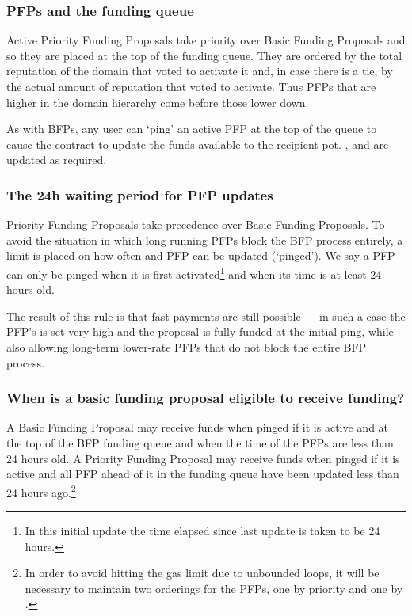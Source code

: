 \subsubsection{PFPs and the funding queue}

Active Priority Funding Proposals take priority over Basic Funding Proposals and so they are placed at the top of the funding queue. They are ordered by the total reputation of the domain that voted to activate it and, in case there is a tie, by the actual amount of reputation that voted to activate. Thus PFPs that are higher in the domain hierarchy come before those lower down.

As with BFPs, any user can `ping' an active PFP at the top of the queue to cause the contract to update the funds available to the recipient pot. ,  and  are updated as required.

\subsubsection{The 24h waiting period for PFP updates}
Priority Funding Proposals take precedence over Basic Funding Proposals. To avoid the situation in which long running PFPs block the BFP process entirely, a limit is placed on how often and PFP can be updated (`pinged'). We say a PFP can only be pinged when it is first activated\footnote{In this initial update the time elapsed since last update is taken to be 24 hours.} and when its  time is at least 24 hours old.

The result of this rule is that fast payments are still possible --- in such a case the PFP's  is set very high and the proposal is fully funded at the initial ping, while also allowing long-term lower-rate PFPs that do not block the entire BFP process.

\subsubsection{When is a basic funding proposal eligible to receive funding?}
A Basic Funding Proposal may receive funds when pinged if it is active and at the top of the BFP funding queue and when the  time of the PFPs are less than 24 hours old. A Priority Funding Proposal may receive funds when pinged if it is active and all PFP ahead of it in the funding queue have been updated less than 24 hours ago.\footnote{In order to avoid hitting the gas limit due to unbounded loops, it will be necessary to maintain two orderings for the PFPs, one by priority and one by . }

